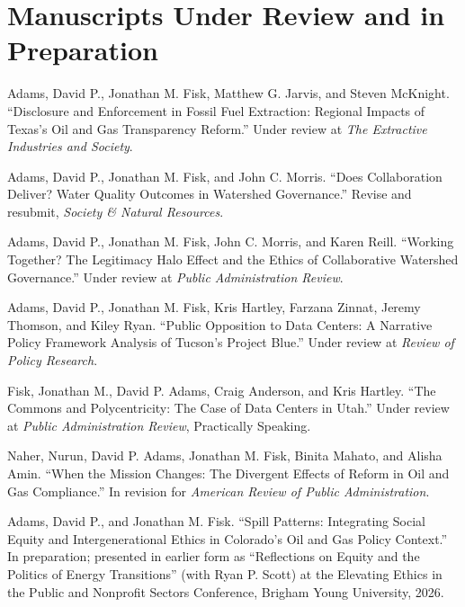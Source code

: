 \documentclass[10pt,letterpaper]{article}
\renewenvironment{itemize}{
  \begin{list}{}{
    \setlength{\leftmargin}{1.5em}
    \setlength{\itemsep}{0.08em}
    \setlength{\parskip}{0pt}
    \setlength{\parsep}{0.08em}
  }
}{
  \end{list}
}
\begin{document}
\section*{Manuscripts Under Review and in Preparation}
\begin{itemize}\leftmargin=2pt\itemindent=-15pt
  \item Adams, David P., Jonathan M. Fisk, Matthew G. Jarvis, and Steven McKnight. ``Disclosure and Enforcement in Fossil Fuel Extraction: Regional Impacts of Texas's Oil and Gas Transparency Reform.'' Under review at \emph{The Extractive Industries and Society}.
  \item Adams, David P., Jonathan M. Fisk, and John C. Morris. ``Does Collaboration Deliver? Water Quality Outcomes in Watershed Governance.'' Revise and resubmit, \emph{Society \& Natural Resources}.
  \item Adams, David P., Jonathan M. Fisk, John C. Morris, and Karen Reill. ``Working Together? The Legitimacy Halo Effect and the Ethics of Collaborative Watershed Governance.'' Under review at \emph{Public Administration Review}.
  \item Adams, David P., Jonathan M. Fisk, Kris Hartley, Farzana Zinnat, Jeremy Thomson, and Kiley Ryan. ``Public Opposition to Data Centers: A Narrative Policy Framework Analysis of Tucson's Project Blue.'' Under review at \emph{Review of Policy Research}.
  \item Fisk, Jonathan M., David P. Adams, Craig Anderson, and Kris Hartley. ``The Commons and Polycentricity: The Case of Data Centers in Utah.'' Under review at \emph{Public Administration Review}, Practically Speaking.
  \item Naher, Nurun, David P. Adams, Jonathan M. Fisk, Binita Mahato, and Alisha Amin. ``When the Mission Changes: The Divergent Effects of Reform in Oil and Gas Compliance.'' In revision for \emph{American Review of Public Administration}.
  \item Adams, David P., and Jonathan M. Fisk. ``Spill Patterns: Integrating Social Equity and Intergenerational Ethics in Colorado's Oil and Gas Policy Context.'' In preparation; presented in earlier form as ``Reflections on Equity and the Politics of Energy Transitions'' (with Ryan P. Scott) at the Elevating Ethics in the Public and Nonprofit Sectors Conference, Brigham Young University, 2026.
\end{itemize}
\end{document}
